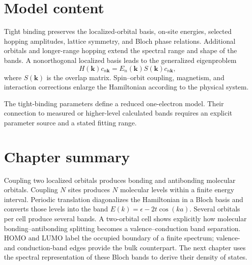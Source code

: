 \section{Model content}

Tight binding preserves the localized-orbital basis, on-site energies, selected
hopping amplitudes, lattice symmetry, and Bloch phase relations.  Additional
orbitals and longer-range hopping extend the spectral range and shape of the
bands.  A nonorthogonal localized basis leads to the generalized eigenproblem
\begin{equation}
  H(\bm k)c_{n\bm k}
  =E_n(\bm k)S(\bm k)c_{n\bm k},
  \label{eq:nonorthogonal-tight-binding-eigenproblem}
\end{equation}
where $S(\bm k)$ is the overlap matrix.  Spin--orbit coupling, magnetism, and
interaction corrections enlarge the Hamiltonian according to the physical
system.

The tight-binding parameters define a reduced one-electron model.  Their
connection to measured or higher-level calculated bands requires an explicit
parameter source and a stated fitting range.

\section{Chapter summary}

Coupling two localized orbitals produces bonding and antibonding molecular
orbitals.  Coupling $N$ sites produces $N$ molecular levels within a finite
energy interval.  Periodic translation diagonalizes the Hamiltonian in a Bloch
basis and converts those levels into the band
$E(k)=\epsilon-2t\cos(ka)$.  Several orbitals per cell produce several bands.
A two-orbital cell shows explicitly how molecular bonding--antibonding splitting
becomes a valence--conduction band separation.  HOMO and LUMO label the occupied
boundary of a finite spectrum; valence- and conduction-band edges provide the
bulk counterpart.  The next chapter uses the spectral representation of these
Bloch bands to derive their density of states.
